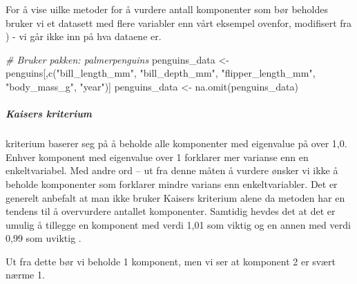\documentclass[
]{article}
\newenvironment{Shaded}{\begin{snugshade}}{\end{snugshade}}
\newcommand{\AttributeTok}[1]{\textcolor[rgb]{0.77,0.63,0.00}{#1}}
\newcommand{\CommentTok}[1]{\textcolor[rgb]{0.56,0.35,0.01}{\textit{#1}}}
\newcommand{\ConstantTok}[1]{\textcolor[rgb]{0.00,0.00,0.00}{#1}}
\newcommand{\DecValTok}[1]{\textcolor[rgb]{0.00,0.00,0.81}{#1}}
\newcommand{\FunctionTok}[1]{\textcolor[rgb]{0.00,0.00,0.00}{#1}}
\newcommand{\NormalTok}[1]{#1}
\newcommand{\OtherTok}[1]{\textcolor[rgb]{0.56,0.35,0.01}{#1}}
\newcommand{\SpecialCharTok}[1]{\textcolor[rgb]{0.00,0.00,0.00}{#1}}
\newcommand{\StringTok}[1]{\textcolor[rgb]{0.31,0.60,0.02}{#1}}
\begin{document}
For å vise uilke metoder for å vurdere antall komponenter som bør beholdes bruker vi et datasett med flere variabler enn vårt eksempel ovenfor, modifisert fra \citet{datavizHowMakeScree2020}) - vi går ikke inn på hva dataene er.

\begin{Shaded}
\begin{Highlighting}[]
\CommentTok{\# Bruker pakken: palmerpenguins}
\NormalTok{penguins\_data }\OtherTok{\textless{}{-}}\NormalTok{ penguins[,}\FunctionTok{c}\NormalTok{(}\StringTok{"bill\_length\_mm"}\NormalTok{, }\StringTok{"bill\_depth\_mm"}\NormalTok{, }\StringTok{"flipper\_length\_mm"}\NormalTok{, }\StringTok{"body\_mass\_g"}\NormalTok{, }\StringTok{"year"}\NormalTok{)]}
\NormalTok{penguins\_data }\OtherTok{\textless{}{-}} \FunctionTok{na.omit}\NormalTok{(penguins\_data)}
\end{Highlighting}
\end{Shaded}

\hypertarget{kaisers-kriterium}{%
\subparagraph{Kaisers kriterium}\label{kaisers-kriterium}}

\citet{kaiserApplicationElectronicComputers1960} kriterium baserer seg på å beholde alle komponenter med eigenvalue på over 1,0. Enhver komponent med eigenvalue over 1 forklarer mer varianse enn en enkeltvariabel. Med andre ord -- ut fra denne måten å vurdere ønsker vi ikke å beholde komponenter som forklarer mindre varians enn enkeltvariabler. Det er generelt anbefalt at man ikke bruker Kaisers kriterium alene da metoden har en tendens til å overvurdere antallet komponenter. Samtidig hevdes det at det er umulig å tillegge en komponent med verdi 1,01 som viktig og en annen med verdi 0,99 som uviktig \citep{fabrigarEvaluatingUseExploratory1999}.

\begin{Shaded}
\end{Shaded}

Ut fra dette bør vi beholde 1 komponent, men vi ser at komponent 2 er svært nærme 1.
\end{document}
